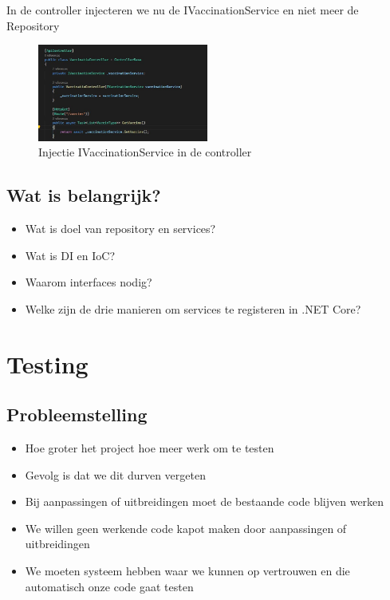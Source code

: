 \documentclass{article}
\begin{document}
In de controller injecteren we nu de IVaccinationService en niet meer de Repository

\begin{figure}[H]
    \centering
    \includegraphics[width=0.5\textwidth]{services-3.png}
    \caption{Injectie IVaccinationService in de controller}
\end{figure}

\subsection{Wat is belangrijk?}

\begin{itemize}
    \item Wat is doel van repository en services?
    \item Wat is DI en IoC?
    \item Waarom interfaces nodig?
    \item Welke zijn de drie manieren om services te registeren in .NET Core?
\end{itemize}

\section{Testing}

\subsection{Probleemstelling}

\begin{itemize}
    \item Hoe groter het project hoe meer werk om te testen
    \item Gevolg is dat we dit durven vergeten
    \item Bij aanpassingen of uitbreidingen moet de bestaande code blijven werken
    \item We willen geen werkende code kapot maken door aanpassingen of uitbreidingen
    \item We moeten systeem hebben waar we kunnen op vertrouwen en die automatisch onze code gaat testen
\end{itemize}
\end{document}
